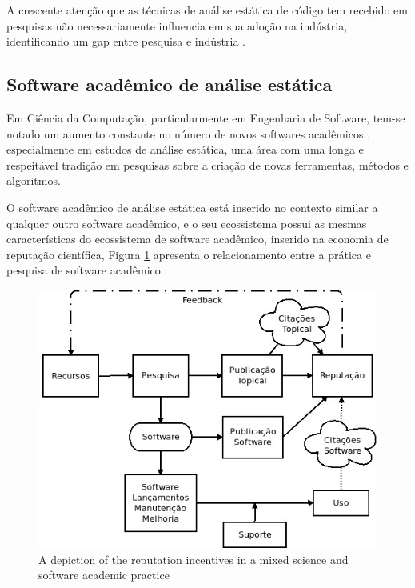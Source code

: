 A crescente atenção que as técnicas de análise estática de código tem
recebido em pesquisas não necessariamente influencia em sua adoção na indústria,
identificando um gap entre pesquisa e indústria \cite{ilyas2016static}.

\subsection{Software acadêmico de análise estática}

Em Ciência da Computação, particularmente em Engenharia de Software, tem-se
notado um aumento constante no número de novos softwares acadêmicos \cite{allen2017engineering},
especialmente em estudos de análise estática, 
uma área com uma longa e respeitável tradição em
pesquisas sobre a criação de novas ferramentas, métodos e algoritmos.


O software acadêmico de análise estática está inserido no contexto similar
a qualquer outro software acadêmico, e o seu ecossistema possui as mesmas
características do ecossistema de software acadêmico, inserido na economia
de reputação científica, Figura \ref{scientific-reputation-diagram} apresenta
o relacionamento entre a prática e pesquisa de software acadêmico.

\begin{figure}[h]
  \center
  \includegraphics[scale=0.5]{imagens/scientific-reputation-diagram.png}
  \caption{A depiction of the reputation incentives in a mixed science and software academic practice \cite{howison2011scientific}}
  \label{scientific-reputation-diagram}
\end{figure}

